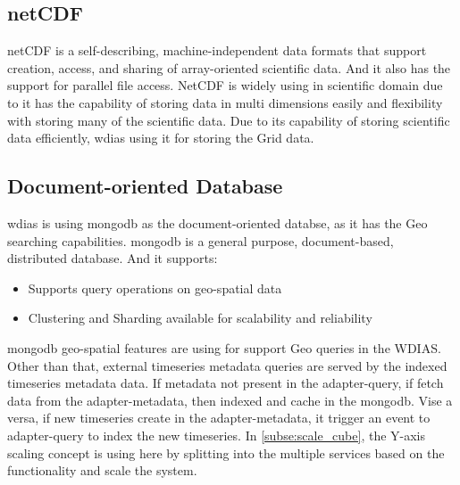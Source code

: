 \subsection{\acrfull{netCDF}}
\label{subse:netcdf}
\acrshort{netCDF} \cite{unidataUnidataNetCDF} is a self-describing, machine-independent data formats that support creation, access, and sharing of array-oriented scientific data.
And it also has the support for parallel file access.
NetCDF is widely using in scientific domain due to it has the capability of storing data in multi dimensions easily and flexibility with storing many of the scientific data. Due to its capability of storing scientific data efficiently, \acrshort{wdias} using it for storing the Grid data.

\subsection{Document-oriented Database}
\label{subse:mongodb}

\acrshort{wdias} is using \acrshort{mongodb} as the document-oriented databse, as it has the Geo searching capabilities.
\acrshort{mongodb} \cite{mongodbMongoDBManual} is a general purpose, document-based, distributed database. And it supports:
\begin{itemize}
  \item Supports query operations on geo-spatial data \cite{mongodbMongoDBManual}
  \item Clustering and Sharding available for scalability and reliability
\end{itemize}
\acrshort{mongodb} geo-spatial features are using for support Geo queries in the WDIAS. Other than that, external timeseries metadata queries are served by the indexed timeseries metadata data.
If metadata not present in the adapter-query, if fetch data from the adapter-metadata, then indexed and cache in the \acrshort{mongodb}. Vise a versa, if new timeseries create in the adapter-metadata, it trigger an event to adapter-query to index the new timeseries.
In \cref{subse:scale_cube}, the Y-axis scaling concept is using here by splitting into the multiple services based on the functionality and scale the system.

